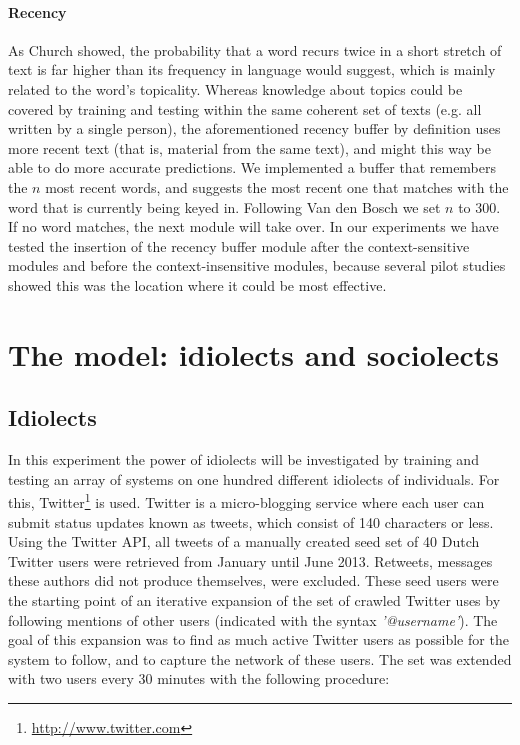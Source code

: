 \documentclass[12pt]{article}
\begin{document}
\paragraph{Recency} \label{rb}

As Church \citeyear{church02} showed, the probability that a word recurs twice in a short stretch of text is far higher than its  frequency in language would suggest, which is mainly related to the word's topicality. Whereas knowledge about topics could be covered by training and testing within the same coherent set of texts (e.g. all written by a single person), the aforementioned recency buffer by definition uses more recent text (that is, material from the same text), and might this way be able to do more accurate predictions. We implemented a buffer that remembers the $n$ most recent words, and suggests the most recent one that matches with the word that is currently being keyed in. Following Van den Bosch \citeyear{vandenbosch11} we set $n$ to 300. If no word matches, the next module will take over. In our experiments we have tested the insertion of the recency buffer module after the context-sensitive modules and before the context-insensitive modules, because several pilot studies showed this was the location where it could be most effective.


\section{The model: idiolects and sociolects} \label{model}

\subsection{Idiolects} \label{idiolects}

In this experiment the power of idiolects will be investigated by training and testing an array of systems on one hundred different idiolects of individuals. For this, Twitter\footnote{\url{http://www.twitter.com}} is used. Twitter is a micro-blogging service where each user can submit status updates known as tweets, which consist of 140 characters or less. Using the Twitter API, all tweets of a manually created seed set of 40 Dutch Twitter users were retrieved from January until June 2013. Retweets, messages these authors did not produce themselves, were excluded. These seed users were the starting point of an iterative expansion of the set of crawled Twitter uses by following mentions of other users (indicated with the syntax \emph{'@username'}). The goal of this expansion was to find as much active Twitter users as possible for the system to follow, and to capture the network of these users. The set was extended with two users every 30 minutes with the following procedure:
\end{document}
